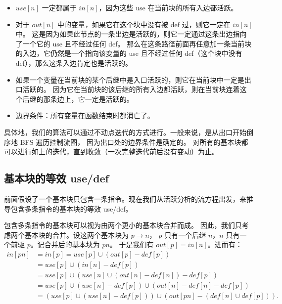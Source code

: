 \begin{itemize}
\item $\mathit{use}[n]$ 一定都属于 $\mathit{in}[n]$，因为这些 use 在当前块的所有入边都活跃。

\item 对于 $\mathit{out}[n]$ 中的变量，如果它在这个块中没有被 def 过，则它一定在 $\mathit{in}[n]$ 中。
这是因为如果此节点的一条出边是活跃的，则它一定通过这条出边指向了一个它的 use 且不经过任何 def。
那么在这条路径前面再任意加一条当前块的入边，它仍然是一个指向该变量的 use 且不经过任何
def（这个块中没有 def），那么这条入边肯定也是活跃的。

\item 如果一个变量在当前块的某个后继中是入口活跃的，则它在当前块中一定是出口活跃的。
因为它在当前块的该后继的所有入边都活跃，则在当前块连着这个后继的那条边上，它一定是活跃的。

\item 边界条件：所有变量在函数结束时都消亡了。
\end{itemize}

具体地，我们的算法可以通过不动点迭代的方式进行。一般来说，是从出口开始倒序地 BFS 遍历控制流图，
因为出口处的边界条件是确定的。
对所有的基本块都可以进行如上的迭代，直到收敛（一次完整迭代前后没有变动）为止。

\subsection{基本块的等效 use/def}

前面假设了一个基本块只包含一条指令。现在我们从活跃分析的流方程出发，来推导包含多条指令的基本块的等效 use/def。

包含多条指令的基本块可以视为由两个更小的基本块合并而成。
因此，我们只考虑两个基本块的合并。设这两个基本块为 $p \to n$，
$p$ 只有一个后继 $n$，$n$ 只有一个前驱 $p$。记合并后的基本块为 $pn$。
于是我们有 $\mathit{out}[p] = \mathit{in}[n]$。进而有：
\begin{align*}
  \mathit{in}[pn] &= \mathit{in}[p] = \mathit{use}[p] \cup (\mathit{out}[p] - \mathit{def}[p]) \\
  &= \mathit{use}[p] \cup (\mathit{in}[n] - \mathit{def}[p]) \\
  &= \mathit{use}[p] \cup \left(\mathit{use}[n] \cup (\mathit{out}[n] - \mathit{def}[n]) - \mathit{def}[p]\right) \\
  &= \mathit{use}[p] \cup (\mathit{use}[n] - \mathit{def}[p]) \cup (\mathit{out}[n] - \mathit{def}[n] - \mathit{def}[p]) \\
  &= \left(\mathit{use}[p] \cup (\mathit{use}[n] - \mathit{def}[p])\right) \cup \left(\mathit{out}[pn]
   - (\mathit{def}[n] \cup \mathit{def}[p])\right).
\end{align*}

